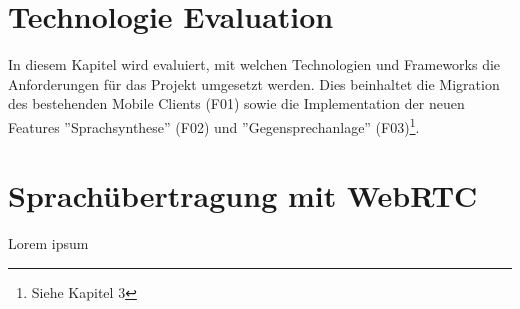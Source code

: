 \section{Technologie Evaluation}

In diesem Kapitel wird evaluiert, mit welchen Technologien und Frameworks die Anforderungen für das Projekt umgesetzt werden.
Dies beinhaltet die Migration des bestehenden Mobile Clients\cite{ip5} (F01) sowie die Implementation der neuen Features ''Sprachsynthese'' (F02) und ''Gegensprechanlage'' (F03)\footnote{Siehe Kapitel 3}.





\clearpage

\section{Sprachübertragung mit WebRTC}

Lorem ipsum
